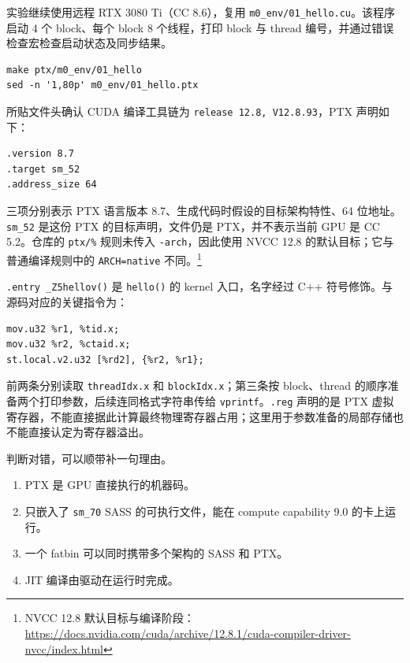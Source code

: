 \documentclass[11pt,a4paper,fontset=none]{ctexart}
\begin{document}
\begin{tcolorbox}[title={模块 8 前置观察：hello 的 PTX（2026-09-11）},breakable]
实验继续使用远程 RTX 3080 Ti（CC 8.6），复用 \texttt{m0\_env/01\_hello.cu}。该程序启动 4 个 block、每个 block 8 个线程，打印 block 与 thread 编号，并通过错误检查宏检查启动状态及同步结果。
\begin{lstlisting}
make ptx/m0_env/01_hello
sed -n '1,80p' m0_env/01_hello.ptx
\end{lstlisting}
所贴文件头确认 CUDA 编译工具链为 \texttt{release 12.8, V12.8.93}，PTX 声明如下：
\begin{lstlisting}[language={}]
.version 8.7
.target sm_52
.address_size 64
\end{lstlisting}
三项分别表示 PTX 语言版本 8.7、生成代码时假设的目标架构特性、64 位地址。\texttt{sm\_52} 是这份 PTX 的目标声明，文件仍是 PTX，并不表示当前 GPU 是 CC 5.2。仓库的 \texttt{ptx/\%} 规则未传入 \texttt{-arch}，因此使用 NVCC 12.8 的默认目标；它与普通编译规则中的 \texttt{ARCH=native} 不同。\footnote{NVCC 12.8 默认目标与编译阶段：\url{https://docs.nvidia.com/cuda/archive/12.8.1/cuda-compiler-driver-nvcc/index.html}}

\texttt{.entry \_Z5hellov()} 是 \texttt{hello()} 的 kernel 入口，名字经过 C++ 符号修饰。与源码对应的关键指令为：
\begin{lstlisting}[language={}]
mov.u32 %r1, %tid.x;
mov.u32 %r2, %ctaid.x;
st.local.v2.u32 [%rd2], {%r2, %r1};
\end{lstlisting}
前两条分别读取 \texttt{threadIdx.x} 和 \texttt{blockIdx.x}；第三条按 block、thread 的顺序准备两个打印参数，后续连同格式字符串传给 \texttt{vprintf}。\texttt{.reg} 声明的是 PTX 虚拟寄存器，不能直接据此计算最终物理寄存器占用；这里用于参数准备的局部存储也不能直接认定为寄存器溢出。
\end{tcolorbox}

判断对错，可以顺带补一句理由。
\begin{enumerate}[label=(\alph*)]
  \item PTX 是 GPU 直接执行的机器码。
  \item 只嵌入了 \texttt{sm\_70} SASS 的可执行文件，能在 compute capability 9.0 的卡上运行。
  \item 一个 fatbin 可以同时携带多个架构的 SASS 和 PTX。
  \item JIT 编译由驱动在运行时完成。
\end{enumerate}
\end{document}
